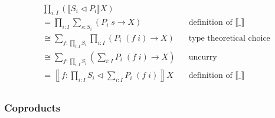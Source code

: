{\begin{code}%
\>[0]\AgdaSpace{}%
\AgdaSymbol{:}\AgdaSpace{}%
\AgdaSymbol{(}\AgdaSpace{}%
\AgdaSpace{}%
\AgdaSymbol{)}\AgdaSpace{}%
\AgdaSpace{}%
\<%
\\
\>[0]\AgdaSpace{}%
\AgdaSymbol{\{}\AgdaSymbol{\}}\AgdaSpace{}%
\AgdaSpace{}%
\AgdaSymbol{=}\AgdaSpace{}%
\AgdaSymbol{((}\AgdaSpace{}%
\AgdaSymbol{:}\AgdaSpace{}%
\AgdaSymbol{)}\AgdaSpace{}%
\AgdaSpace{}%
\AgdaSpace{}%
\AgdaSpace{}%
\AgdaSymbol{)}\AgdaSpace{}%
\AgdaSpace{}%
\AgdaSpace{}%
\AgdaSpace{}%
\AgdaSpace{}%
\AgdaFunction{Σ[}\AgdaSpace{}%
\AgdaSpace{}%
\AgdaSpace{}%
\AgdaSpace{}%
\AgdaFunction{]}\AgdaSpace{}%
\AgdaSpace{}%
\AgdaSpace{}%
\AgdaSpace{}%
\AgdaSymbol{(}\AgdaSpace{}%
\AgdaSymbol{)}\<%
\end{code}

\begin{align*}
& \prod_{i : I} (\llbracket S_i \triangleleft P_i \rrbracket X) \\
&= \prod_{i : I} \sum_{s : S_i} (P_i \; s \to X) && \text{definition of $\llbracket \_ \rrbracket$} \\
&\cong \sum_{f : \prod_{i : I} S_i} \prod_{i : I} (P_i \; (f \; i) \to X) && \text{type theoretical choice} \\
&\cong \sum_{f : \prod_{i : I} S_i} \left( \sum_{i : I} P_i \; (f \; i) \to X \right) && \text{uncurry} \\
&= \left\llbracket f : \prod_{i : I} S_i \triangleleft \sum_{i : I} P_i \; (f \; i) \right\rrbracket X && \text{definition of $\llbracket \_ \rrbracket$} \\
\end{align*}

\subsubsection*{Coproducts}

}
